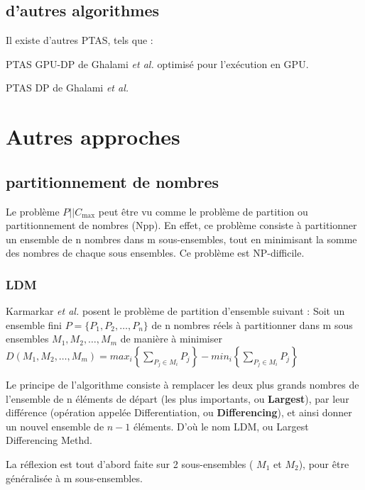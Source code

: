 \documentclass[a4paper,12pt]{report}
\theoremstyle{plain}				%
\theoremstyle{definition}				%
\newcommand\problemGrahamP{$P||C_{\max}$\xspace}
\begin{document}
\subsection{d'autres algorithmes}
Il existe d'autres PTAS, tels que :

PTAS GPU-DP de Ghalami \emph{et al.} \cite{li2018gpu} optimisé pour l'exécution en GPU.

PTAS DP de Ghalami \emph{et al.} \cite{ghalami2019scheduling}


\section{Autres approches}

\subsection{partitionnement de nombres}
Le problème \problemGrahamP peut être vu comme le problème de partition ou partitionnement de nombres (Npp). 
En effet, ce problème consiste à partitionner un ensemble de n nombres dans m sous-ensembles, 
tout en minimisant la somme des nombres de chaque sous ensembles.
Ce problème est NP-difficile.  

\subsubsection{LDM}


Karmarkar \emph{et al.} \cite{karmarkar1982differencing} posent le problème de partition d'ensemble suivant :
Soit un ensemble fini $P=\{P_1, P_2, \ldots, P_n\}$ de 
n nombres réels 
à partitionner dans m sous ensembles $M_1, M_2, \ldots, M_m$ 
de manière à minimiser 
$D(M_1, M_2, \ldots, M_m) = max_i \left\{ \sum_{P_j \in M_i}P_j \right\} - min_i \left\{ \sum_{P_j \in M_i}P_j \right\}$  

Le principe de l'algorithme consiste à remplacer les deux plus grands nombres de l'ensemble de n éléments de départ 
(les plus importants, ou \textbf{Largest}), 
par leur différence 
(opération appelée Differentiation, ou \textbf{Differencing}), 
et ainsi donner un nouvel ensemble de $n-1$ éléments. 
D'où le nom LDM, ou Largest Differencing Methd.


La réflexion est tout d'abord faite sur 2 sous-ensembles ( $M_1$ et $M_2$), pour être généralisée à m sous-ensembles.
\end{document}

